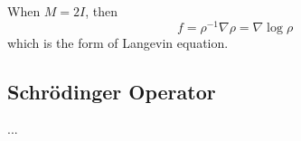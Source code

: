 \begin{example}
    When $M = 2I$, then 
    \begin{equation}
        f = \rho^{-1}\nabla\rho = \nabla \log \rho
    \end{equation}
    which is the form of Langevin equation.
\end{example}
\subsection{Schrödinger Operator}
...

